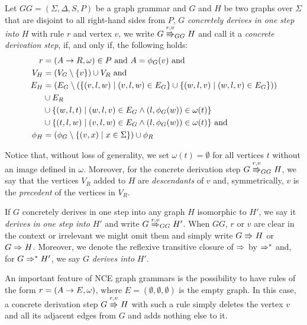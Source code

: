 \begin{definition}
	\label{def:gg_dstep}
	Let $GG = (\Sigma, \Delta, S, P)$ be a graph grammar and $G$ and $H$ be two graphs over $\Sigma$ that are disjoint to all right-hand sides from $P$, $G$ \emph{concretely derives in one step into} $H$ with rule $r$ and vertex $v$, we write $G \cderiv{r}{v}{GG} H$ and call it a \emph{concrete derivation step}, if, and only if, the following holds:
	\begin{align*}
		r & = (A \to R, \omega) \in P \text{ and } A = \phi_G(v) \text{ and} \\
		V_H  & = (V_G \setminus \{v\}) \cup V_R \text{ and} \\
		E_H & = (E_G \setminus (\{(v,l,w) \; | \; (v,l,w) \in E_G\} \cup \{(w,l,v) \; | \; (w,l,v) \in E_G\})) \\
		& \cup E_R \\
		& \cup \{(w,l,t) \; | \; (w,l,v) \in E_G \land (l,\phi_G(w)) \in \omega(t)\} \\
		& \cup \{(t,l,w) \; | \; (v,l,w) \in E_G \land (l,\phi_G(w)) \in \omega(t)\} \text{ and} \\
		\phi_H & = (\phi_G \setminus \{(v,x) \; | \; x \in \Sigma \}) \cup \phi_R
	\end{align*}
\end{definition}

Notice that, without loss of generality, we set $\omega(t) = \emptyset$ for all vertices $t$ without an image defined in $\omega$. Moreover, for the concrete derivation step $G \cderiv{r}{v}{GG} H$, we say that the vertices $V_R$ added to $H$ are \emph{descendants} of $v$ and, symmetrically, $v$ is the \emph{precedent} of the vertices in $V_R$.

If $G$ concretely derives in one step into any graph $H$ isomorphic to $H'$, we say it \emph{derives in one step into} $H'$ and write $G \deriv{r}{v}{GG} H'$. When $GG$, $r$ or $v$ are clear in the context or irrelevant we might omit them and simply write $G \cderiv{}{}{} H$ or $G \deriv{}{}{} H$. Moreover, we denote the reflexive transitive closure of $\deriv{}{}{}$ by $\Rightarrow^*_{}$ and, for $G \Rightarrow^*_{} H'$, we say $G$ \emph{derives into} $H'$.

An important feature of NCE graph grammars is the possibility to have rules of the form $r = (A \to E, \omega)$, where $E = (\emptyset,\emptyset,\emptyset)$ is the empty graph. In this case, a concrete derivation step $G \cderiv{r}{v}{} H$ with such a rule simply deletes the vertex $v$ and all its adjacent edges from $G$ and adds nothing else to it.

